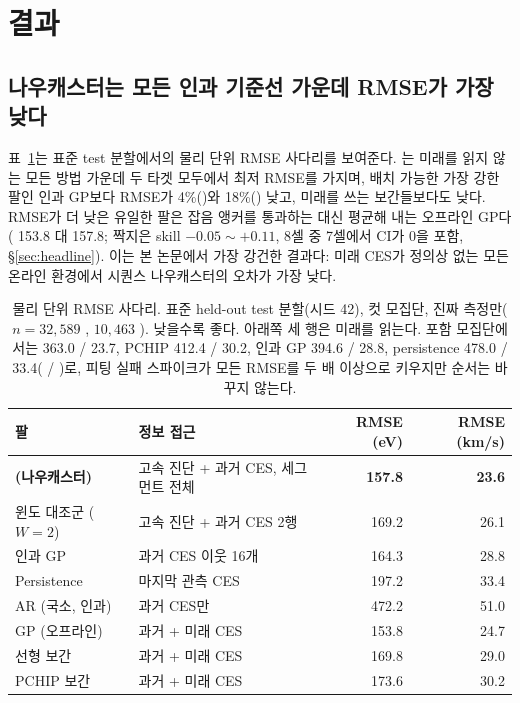 \documentclass[10pt,a4paper]{article}
\begin{document}
\section{결과}
\label{sec:results}

\subsection{나우캐스터는 모든 인과 기준선 가운데 RMSE가 가장 낮다}
표~\ref{tab:ladder}는 표준 test 분할에서의 물리 단위 RMSE 사다리를 보여준다.
\seqv{}는 미래를 읽지 않는 모든 방법 가운데 두 타겟 모두에서 최저 RMSE를 가지며,
배치 가능한 가장 강한 팔인 인과 GP보다 RMSE가 4\%(\Ti{})와 18\%(\Vrot{}) 낮고,
미래를 쓰는 보간들보다도 낮다. \Ti{} RMSE가 더 낮은 유일한 팔은 잡음 앵커를
통과하는 대신 평균해 내는 오프라인 GP다(\Ti{} 153.8 대 157.8; 짝지은 skill
$-0.05\sim+0.11$, 8셀 중 7셀에서 CI가 0을 포함, \S\ref{sec:headline}). 이는 본
논문에서 가장 강건한 결과다: 미래 CES가 정의상 없는 모든 온라인 환경에서 시퀀스
나우캐스터의 오차가 가장 낮다.

\begin{table}[t]
  \centering
  \caption{물리 단위 RMSE 사다리. 표준 held-out test 분할(시드 42), 컷 모집단,
  진짜 측정만($n = 32{,}589$ \Ti{}, $10{,}463$ \Vrot{}). 낮을수록 좋다. 아래쪽
  세 행은 미래를 읽는다. 포함 모집단에서는 \seqv{} 363.0 / 23.7, PCHIP
  412.4 / 30.2, 인과 GP 394.6 / 28.8, persistence 478.0 / 33.4(\Ti{} / \Vrot{})로,
  피팅 실패 스파이크가 모든 \Ti{} RMSE를 두 배 이상으로 키우지만 순서는 바꾸지
  않는다.}
  \label{tab:ladder}
  \small
  \begin{tabular}{llrr}
    \toprule
    팔 & 정보 접근 & \Ti{} RMSE (eV) & \Vrot{} RMSE (km/s) \\
    \midrule
    \textbf{\seqv{} (나우캐스터)} & 고속 진단 + 과거 CES, 세그먼트 전체 & \textbf{157.8} & \textbf{23.6} \\
    윈도 대조군 ($W{=}2$) & 고속 진단 + 과거 CES 2행 & 169.2 & 26.1 \\
    인과 GP & 과거 CES 이웃 16개 & 164.3 & 28.8 \\
    Persistence & 마지막 관측 CES & 197.2 & 33.4 \\
    AR (국소, 인과) & 과거 CES만 & 472.2 & 51.0 \\
    \midrule
    GP (오프라인) & 과거 + 미래 CES & 153.8 & 24.7 \\
    선형 보간 & 과거 + 미래 CES & 169.8 & 29.0 \\
    PCHIP 보간 & 과거 + 미래 CES & 173.6 & 30.2 \\
    \bottomrule
  \end{tabular}
\end{table}
\end{document}

